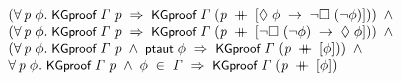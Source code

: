 \documentclass{report}
\renewcommand{\HOLConst}[1]{{\textsf{\upshape\small #1}}}
\newenvironment{holmath}{\begin{displaymath}\begin{array}{l}}{\end{array}\end{displaymath}\ignorespacesafterend}
\begin{document}
\begin{holmath}
\;\;\;\;\;(\HOLSymConst{\HOLTokenForall{}}\HOLBoundVar{p}\;\HOLBoundVar{\ensuremath{\phi}}.\;\HOLConst{KGproof}\;\HOLFreeVar{\ensuremath{\Gamma}}\;\HOLBoundVar{p}\;\HOLSymConst{\HOLTokenImp{}}\;\HOLConst{KGproof}\;\HOLFreeVar{\ensuremath{\Gamma}}\;(\HOLBoundVar{p}\;\HOLSymConst{\HOLTokenDoublePlus}\;[\HOLSymConst{\ensuremath{\Diamond}}\;\HOLBoundVar{\ensuremath{\phi}}\;\HOLSymConst{\ensuremath{\rightarrow}}\;\HOLSymConst{\HOLTokenNeg{}}\HOLSymConst{\ensuremath{\Box}}\;(\HOLSymConst{\HOLTokenNeg{}}\HOLBoundVar{\ensuremath{\phi}})]))\;\HOLSymConst{\HOLTokenConj{}}\\
\;\;\;\;\;(\HOLSymConst{\HOLTokenForall{}}\HOLBoundVar{p}\;\HOLBoundVar{\ensuremath{\phi}}.\;\HOLConst{KGproof}\;\HOLFreeVar{\ensuremath{\Gamma}}\;\HOLBoundVar{p}\;\HOLSymConst{\HOLTokenImp{}}\;\HOLConst{KGproof}\;\HOLFreeVar{\ensuremath{\Gamma}}\;(\HOLBoundVar{p}\;\HOLSymConst{\HOLTokenDoublePlus}\;[\HOLSymConst{\HOLTokenNeg{}}\HOLSymConst{\ensuremath{\Box}}\;(\HOLSymConst{\HOLTokenNeg{}}\HOLBoundVar{\ensuremath{\phi}})\;\HOLSymConst{\ensuremath{\rightarrow}}\;\HOLSymConst{\ensuremath{\Diamond}}\;\HOLBoundVar{\ensuremath{\phi}}]))\;\HOLSymConst{\HOLTokenConj{}}\\
\;\;\;\;\;(\HOLSymConst{\HOLTokenForall{}}\HOLBoundVar{p}\;\HOLBoundVar{\ensuremath{\phi}}.\;\HOLConst{KGproof}\;\HOLFreeVar{\ensuremath{\Gamma}}\;\HOLBoundVar{p}\;\HOLSymConst{\HOLTokenConj{}}\;\HOLConst{ptaut}\;\HOLBoundVar{\ensuremath{\phi}}\;\HOLSymConst{\HOLTokenImp{}}\;\HOLConst{KGproof}\;\HOLFreeVar{\ensuremath{\Gamma}}\;(\HOLBoundVar{p}\;\HOLSymConst{\HOLTokenDoublePlus}\;[\HOLBoundVar{\ensuremath{\phi}}]))\;\HOLSymConst{\HOLTokenConj{}}\\
\;\;\;\;\;\HOLSymConst{\HOLTokenForall{}}\HOLBoundVar{p}\;\HOLBoundVar{\ensuremath{\phi}}.\;\HOLConst{KGproof}\;\HOLFreeVar{\ensuremath{\Gamma}}\;\HOLBoundVar{p}\;\HOLSymConst{\HOLTokenConj{}}\;\HOLBoundVar{\ensuremath{\phi}}\;\HOLSymConst{\HOLTokenIn{}}\;\HOLFreeVar{\ensuremath{\Gamma}}\;\HOLSymConst{\HOLTokenImp{}}\;\HOLConst{KGproof}\;\HOLFreeVar{\ensuremath{\Gamma}}\;(\HOLBoundVar{p}\;\HOLSymConst{\HOLTokenDoublePlus}\;[\HOLBoundVar{\ensuremath{\phi}}])
\end{holmath}
\end{document}
